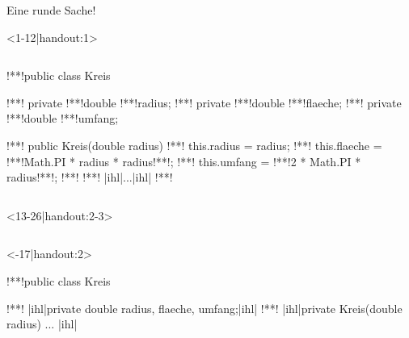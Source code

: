\begin{frame}[c,fragile]{Eine runde Sache!}
\begin{onlyenv}<1-12|handout:1>
\begin{columns}[c,onlytextwidth]
\footnotesize{}\medskip\par
{}
\SetupLstHl
\begin{plainjava}
!**!public class Kreis {
!**!   private !**!double !**!radius;
!**!   private !**!double !**!flaeche;
!**!   private !**!double !**!umfang;

!**!   public Kreis(double radius) {
!**!       this.radius = radius;
!**!       this.flaeche = !**!Math.PI * radius * radius!**!;
!**!       this.umfang = !**!2 * Math.PI * radius!**!;
!**!   }
!**!   |ihl|...|ihl|
!**!}
\end{plainjava}
\end{columns}
\end{onlyenv}
\begin{onlyenv}<13-26|handout:2-3>
\begin{columns}[c,onlytextwidth]
\footnotesize{}\medskip\par
{}
\SetupLstHl
\begin{onlyenv}<-17|handout:2>
\begin{plainjava}
!**!public class Kreis {
!**!   |ihl|private double radius, flaeche, umfang;|ihl|
!**!   |ihl|private Kreis(double radius)  { ... }|ihl|

}
\end{plainjava}
\end{onlyenv}
\end{columns}
\end{onlyenv}
\end{frame}
